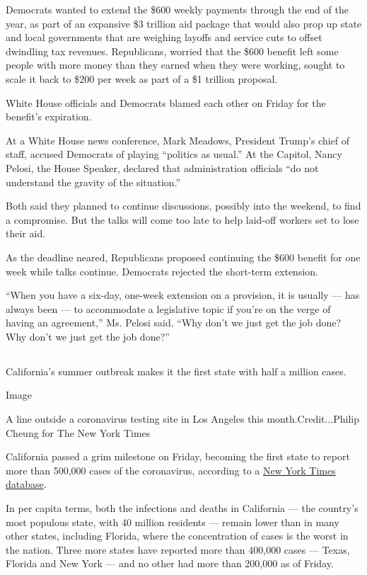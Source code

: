 Democrats wanted to extend the \$600 weekly payments through the end of
the year, as part of an expansive \$3 trillion aid package that would
also prop up state and local governments that are weighing layoffs and
service cuts to offset dwindling tax revenues. Republicans, worried that
the \$600 benefit left some people with more money than they earned when
they were working, sought to scale it back to \$200 per week as part of
a \$1 trillion proposal.

White House officials and Democrats blamed each other on Friday for the
benefit's expiration.

At a White House news conference, Mark Meadows, President Trump's chief
of staff, accused Democrats of playing ``politics as usual.'' At the
Capitol, Nancy Pelosi, the House Speaker, declared that administration
officials ``do not understand the gravity of the situation.''

Both said they planned to continue discussions, possibly into the
weekend, to find a compromise. But the talks will come too late to help
laid-off workers set to lose their aid.

As the deadline neared, Republicans proposed continuing the \$600
benefit for one week while talks continue. Democrats rejected the
short-term extension.

``When you have a six-day, one-week extension on a provision, it is
usually --- has always been --- to accommodate a legislative topic if
you're on the verge of having an agreement,'' Ms. Pelosi said. ``Why
don't we just get the job done? Why don't we just get the job done?''

\hypertarget{-1}{%
\subsection{}\label{-1}}

California's summer outbreak makes it the first state with half a
million cases.

Image

A line outside a coronavirus testing site in Los Angeles this
month.Credit...Philip Cheung for The New York Times

California passed a grim milestone on Friday, becoming the first state
to report more than 500,000 cases of the coronavirus, according to a
\href{https://www.nytimes.com/interactive/2020/us/coronavirus-us-cases.html\#states}{New
York Times database}.

In per capita terms, both the infections and deaths in California ---
the country's most populous state, with 40 million residents --- remain
lower than in many other states, including Florida, where the
concentration of cases is the worst in the nation. Three more states
have reported more than 400,000 cases --- Texas, Florida and New York
--- and no other had more than 200,000 as of Friday.


